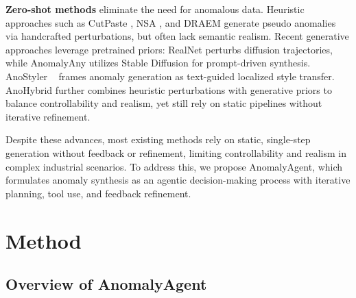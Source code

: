 \documentclass[sigconf]{acmart}
\begin{document}
\textbf{Zero-shot methods} eliminate the need for anomalous data. Heuristic approaches such as CutPaste \cite{DBLP:conf/cvpr/LiSYP21}, NSA \cite{DBLP:conf/eccv/SchluterTHK22}, and DRAEM \cite{DBLP:conf/iccv/ZavrtanikKS21} generate pseudo anomalies via handcrafted perturbations, but often lack semantic realism. Recent generative approaches leverage pretrained priors: RealNet \cite{DBLP:conf/cvpr/Zhang0Z24} perturbs diffusion trajectories, while AnomalyAny \cite{DBLP:conf/cvpr/SunCDF25} utilizes Stable Diffusion \cite{DBLP:conf/cvpr/RombachBLEO22} for prompt-driven synthesis. AnoStyler ~\cite{DBLP:journals/corr/abs-2511-06687} frames anomaly generation as text-guided localized style transfer. AnoHybrid \cite{DBLP:conf/cvpr/Zhao25} further combines heuristic perturbations with generative priors to balance controllability and realism, yet still rely on static pipelines without iterative refinement.

Despite these advances, most existing methods rely on static, single-step generation without feedback or refinement, limiting controllability and realism in complex industrial scenarios. To address this, we propose AnomalyAgent, which formulates anomaly synthesis as an agentic decision-making process with iterative planning, tool use, and feedback refinement.

\section{Method}

\subsection{Overview of AnomalyAgent}
\end{document}
